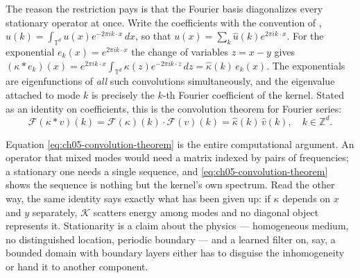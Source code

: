 The reason the restriction pays is that the Fourier basis diagonalizes every
stationary operator at once. Write the coefficients with the convention of
,
$\hat{u}(k) = \int_{\mathbb{T}^d} u(x) e^{-2\pi i k \cdot x}\,dx$, so that
$u(x) = \sum_{k} \hat{u}(k) e^{2\pi i k \cdot x}$. For the exponential
$e_k(x) = e^{2\pi i k \cdot x}$ the change of variables $z = x - y$ gives
$(\kappa * e_k)(x) = e^{2\pi i k \cdot x} \int_{\mathbb{T}^d} \kappa(z)
e^{-2\pi i k \cdot z}\,dz = \hat{\kappa}(k)\, e_k(x)$. The exponentials are
eigenfunctions of \emph{all} such convolutions simultaneously, and the
eigenvalue attached to mode $k$ is precisely the $k$-th Fourier coefficient of
the kernel. Stated as an identity on coefficients, this is the convolution
theorem for Fourier series:
\begin{equation}
  \label{eq:ch05-convolution-theorem}
  \mathcal{F}(\kappa * v)(k) = \mathcal{F}(\kappa)(k) \cdot \mathcal{F}(v)(k) = \hat{\kappa}(k) \, \hat{v}(k), \quad k \in \mathbb{Z}^d.
\end{equation}

Equation \eqref{eq:ch05-convolution-theorem} is the entire computational
argument. An operator that mixed modes would need a matrix indexed by pairs of
frequencies; a stationary one needs a single sequence, and \eqref{eq:ch05-convolution-theorem}
shows the sequence is nothing but the kernel's own spectrum. Read the other
way, the same identity says exactly what has been given up: if $\kappa$ depends
on $x$ and $y$ separately, $\mathcal{K}$ scatters energy among modes and no
diagonal object represents it. Stationarity is a claim about the physics
--- homogeneous medium, no distinguished location, periodic boundary --- and a
learned filter on, say, a bounded domain with boundary layers either has to
disguise the inhomogeneity or hand it to another component.

